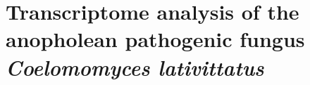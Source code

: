 ﻿%
\chapter{Transcriptome analysis of the anopholean pathogenic fungus \textit{Coelomomyces lativittatus}}
\label{chap:ClatTranscriptome}

